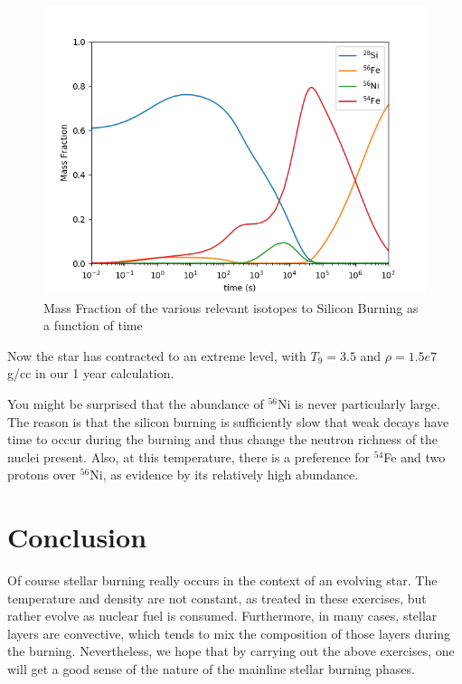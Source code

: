 \documentclass[manuscript]{aastex62}
\begin{document}
\begin{figure}[H]
\centering
\includegraphics[scale=0.7]{task8}
\caption{Mass Fraction of the various relevant isotopes to Silicon Burning as a function of time}
\end{figure}
Now the star has contracted to an extreme level, with $T_9 = 3.5$ and $\rho = 1.5e7$ g/cc in our 1 year calculation.


You might be surprised that the abundance of $^{56}$Ni is never particularly
large.  The reason is that the silicon burning is sufficiently slow that
weak decays have time to occur during the burning and thus change the
neutron richness of the nuclei present.  Also, at this temperature, there
is a preference for $^{54}$Fe and two protons over $^{56}$Ni, as evidence by its relatively high abundance. 

\section{Conclusion}

Of course stellar burning really occurs in the context of an evolving star.
The temperature and density are not constant, as treated in these exercises,
but rather evolve as nuclear fuel is consumed.  Furthermore, in many cases,
stellar layers are convective, which tends to mix the composition of those
layers during the burning.  
Nevertheless, we hope that by
carrying out the above exercises, one will get a good sense of the
nature of the mainline stellar burning phases.
\end{document}
